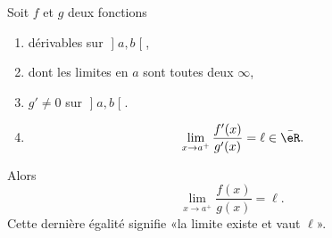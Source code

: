 \begin{proposition}
    Soit \( f\) et \( g\) deux fonctions
    \begin{enumerate}
        \item
            dérivables sur \( \mathopen] a , b \mathclose[\),
        \item
                dont les limites en \( a\) sont toutes deux \( \infty\),
            \item
            \( g'\neq 0\) sur \( \mathopen] a , b \mathclose[\).
        \item
            \begin{equation}        \label{EQooVFYCooMjOGtI}
                \lim_{x\to a^+} \frac{ f'(x) }{ g'(x) }=\ell\in \bar \eR.
            \end{equation}
    \end{enumerate}
    Alors
    \begin{equation}
        \lim_{x\to a^+} \frac{ f(x) }{ g(x) }=\ell.
    \end{equation}
    Cette dernière égalité signifie «la limite existe et vaut \( \ell\)».
\end{proposition}

